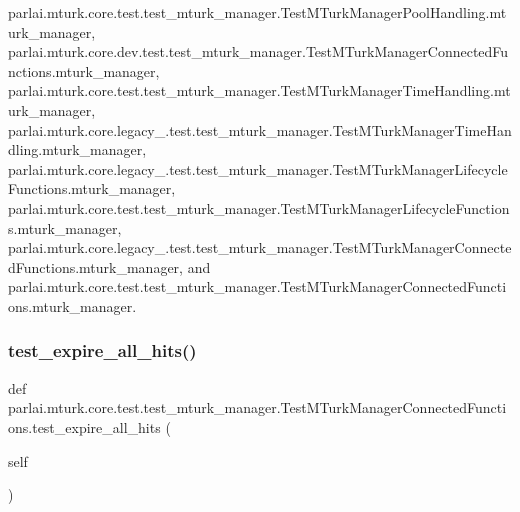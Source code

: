 parlai.\+mturk.\+core.\+test.\+test\+\_\+mturk\+\_\+manager.\+Test\+M\+Turk\+Manager\+Pool\+Handling.\+mturk\+\_\+manager, parlai.\+mturk.\+core.\+dev.\+test.\+test\+\_\+mturk\+\_\+manager.\+Test\+M\+Turk\+Manager\+Connected\+Functions.\+mturk\+\_\+manager, parlai.\+mturk.\+core.\+test.\+test\+\_\+mturk\+\_\+manager.\+Test\+M\+Turk\+Manager\+Time\+Handling.\+mturk\+\_\+manager, parlai.\+mturk.\+core.\+legacy\+\_.\+test.\+test\+\_\+mturk\+\_\+manager.\+Test\+M\+Turk\+Manager\+Time\+Handling.\+mturk\+\_\+manager, parlai.\+mturk.\+core.\+legacy\+\_.\+test.\+test\+\_\+mturk\+\_\+manager.\+Test\+M\+Turk\+Manager\+Lifecycle\+Functions.\+mturk\+\_\+manager, parlai.\+mturk.\+core.\+test.\+test\+\_\+mturk\+\_\+manager.\+Test\+M\+Turk\+Manager\+Lifecycle\+Functions.\+mturk\+\_\+manager, parlai.\+mturk.\+core.\+legacy\+\_.\+test.\+test\+\_\+mturk\+\_\+manager.\+Test\+M\+Turk\+Manager\+Connected\+Functions.\+mturk\+\_\+manager, and parlai.\+mturk.\+core.\+test.\+test\+\_\+mturk\+\_\+manager.\+Test\+M\+Turk\+Manager\+Connected\+Functions.\+mturk\+\_\+manager.

\mbox{\label{classparlai_1_1mturk_1_1core_1_1test_1_1test__mturk__manager_1_1TestMTurkManagerConnectedFunctions_a9b18b72e9d38a4c4efb0990f9cb7ce22}} 
\subsubsection{\texorpdfstring{test\+\_\+expire\+\_\+all\+\_\+hits()}{test\_expire\_all\_hits()}}
{\footnotesize\ttfamily def parlai.\+mturk.\+core.\+test.\+test\+\_\+mturk\+\_\+manager.\+Test\+M\+Turk\+Manager\+Connected\+Functions.\+test\+\_\+expire\+\_\+all\+\_\+hits (\begin{DoxyParamCaption}\item[{}]{self }\end{DoxyParamCaption})}



